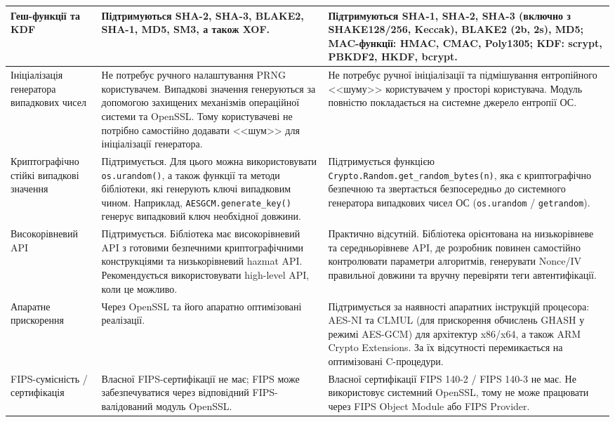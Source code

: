 \begin{longtable}{|p{2cm}|p{6cm}|p{6cm}|}
Геш-функції та KDF &
Підтримуються  SHA-2, SHA-3, BLAKE2, SHA-1, MD5, SM3, а також XOF.&
Підтримуються SHA-1, SHA-2, SHA-3 (включно з SHAKE128/256, Keccak), BLAKE2 (2b, 2s), MD5; MAC-функції: HMAC, CMAC, Poly1305; KDF: scrypt, PBKDF2, HKDF, bcrypt. \\
\hline

Ініціаліза\-ція генератора ви\-падкових чисел &
Не потребує ручного налаштування PRNG користувачем. Випадкові значення генеруються 
за допомогою захищених механізмів операційної системи та OpenSSL. 
Тому користувачеві не потрібно самостійно додавати <<шум>> для ініціалізації генератора.&
Не потребує ручної ініціалізації та підмішування ентропійного <<шуму>> користувачем у просторі користувача. Модуль повністю покладається на системне джерело ентропії ОС. \\
\hline

Крипто\-графічно стійкі випадкові значення &
Підтримується. Для цього можна використовувати \texttt{os.urandom()}, 
а також функції та методи бібліотеки, які генерують ключі випадковим чином. 
Наприклад, \texttt{AESGCM.generate\_key()} генерує випадковий ключ необхідної довжини. &
Підтримується функцією {\footnotesize\texttt{Crypto.Random.get\_random\_bytes(n)}}, яка є криптографічно безпечною та звертається безпосередньо до системного генератора випадкових чисел ОС (\texttt{os.urandom} / \texttt{getrandom}). \\
\hline

Високо\-рівневий API &
Підтримується. Бібліотека має високорівневий API з готовими безпечними криптографічними конструкціями та низькорівневий hazmat API. 
Рекомендується використовувати high-level API, коли це можливо.&
Практично відсутній. Бібліотека орієнтована на низькорівневе та середньорівневе API, де розробник повинен самостійно контролювати параметри алгоритмів, генерувати Nonce/IV правильної довжини та вручну перевіряти теги автентифікації. \\
\hline

Апаратне прискорення &
Через OpenSSL та його апаратно оптимізовані реалізації.&
Підтримується за наявності апаратних інструкцій процесора: AES-NI та CLMUL (для прискорення обчислень GHASH у режимі AES-GCM) для архітектур x86/x64, а також ARM Crypto Extensions. За їх відсутності перемикається на оптимізовані C-процедури. \\
\hline

FIPS-сумісність / сертифікація &
Власної FIPS-сертифікації не має; 
FIPS може забезпечуватися через відповідний FIPS-валідований модуль OpenSSL.&
Власної сертифікації FIPS 140-2 / FIPS 140-3 не має. Не використовує системний OpenSSL, тому не може працювати через FIPS Object Module або FIPS Provider. \\
\hline


\end{longtable}
